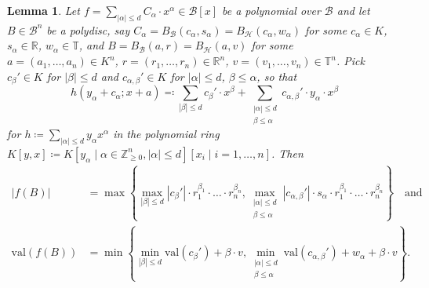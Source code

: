 \documentclass[10pt]{article}
\newtheorem{lemma}[theorem]{Lemma}
\theoremstyle{definition}
\newcommand{\RR}{\mathbb{R}}
\newcommand{\TT}{\mathbb{T}}
\newcommand{\ZZ}{\mathbb{Z}}
\newcommand{\val}{{\mathrm{val}}}
\begin{document}
\begin{lemma}
  \label{lem:formula}
  Let $f=\sum_{|\alpha|\leq d} C_\alpha\cdot x^\alpha\in \mathcal B[x]$ be a polynomial over $\mathcal B$ and let $B\in\mathcal B^n$ be a polydisc, say $C_\alpha=B_{\mathcal{B}}(c_\alpha,s_\alpha)=B_{\mathcal{H}}(c_\alpha,w_\alpha)$ for some $c_\alpha\in K$, $s_{\alpha}\in\RR$, $w_\alpha\in\TT$, and $B=B_{\mathcal{B}}(a,r)=B_{\mathcal{H}}(a,v)$ for some $a=(a_1,\dots,a_n)\in K^n$, $r=(r_1,\dots,r_n)\in\RR^n$, $v=(v_1,\dots,v_n)\in \TT^n$.
  Pick $c_\beta'\in K$ for $|\beta|\leq d$ and $c_{\alpha,\beta}'\in K$ for $|\alpha|\leq d$, $\beta\leq\alpha$, so that
  \begin{equation}
      \label{eq:formula}
      h(y_\alpha+c_\alpha; x+a) \eqqcolon 
      \sum_{|\beta|\leq d} c_{\beta}'\cdot x^\beta + \sum_{\substack{|\alpha|\leq d\\ \beta\leq\alpha}} c_{\alpha,\beta}'\cdot y_\alpha\cdot x^\beta  
  \end{equation}
  for $h\coloneqq \sum_{|\alpha|\leq d} y_\alpha x^\alpha$ in the polynomial ring $K[y,x]\coloneqq K[y_\alpha\mid \alpha\in\ZZ_{\geq 0}^n, |\alpha|\leq d][x_i\mid i=1,\dots,n]$.  Then
  \begin{align*}
    |f(B)| &= \max\left\{
      \max_{|\beta|\leq d} |c_\beta'|\cdot r_1^{\beta_1}\cdot \ldots\cdot r_n^{\beta_n},
      \max_{\substack{|\alpha|\leq d\\ \beta \le \alpha}} |c_{\alpha,\beta}'|\cdot s_\alpha\cdot r_1^{\beta_1}\cdot \ldots\cdot r_n^{\beta_n}
    \right\} \quad \text{and}\\
    \val(f(B)) &= \min\left\{
      \min_{|\beta|\leq d} \val(c_\beta') + \beta\cdot v,
      \min_{\substack{|\alpha|\leq d\\ \beta \le \alpha}} \val(c_{\alpha,\beta}') + w_\alpha + \beta\cdot v
    \right\}.
  \end{align*}
\end{lemma}
\end{document}
